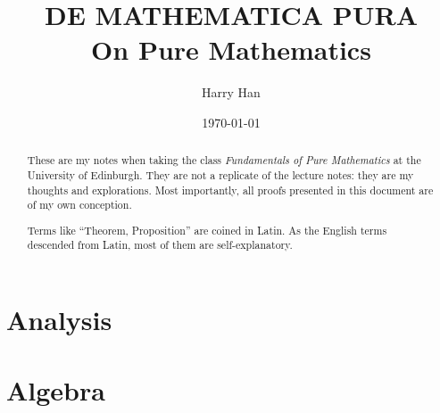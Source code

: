 \documentclass[12pt, a4paper]{report}
\title{
	DE MATHEMATICA PURA \\
	\large On Pure Mathematics
}
\author{Harry Han}
\date{\today}
\theoremstyle{definition}
\theoremstyle{definition}
\theoremstyle{remark}
\begin{document}
\maketitle
\tableofcontents

\newpage

\begin{abstract}
	These are my notes when taking the class \textit{Fundamentals of Pure Mathematics} at the University of Edinburgh. They are not a replicate of the lecture notes: they are my thoughts and explorations. 
	Most importantly, all proofs presented in this document are of my own conception. 

	Terms like ``Theorem, Proposition'' are coined in Latin. As the English terms descended from Latin, most of them are self-explanatory. 
\end{abstract}

\chapter{Analysis}










\chapter{Algebra}





\appendix


\printbibliography
\end{document}

